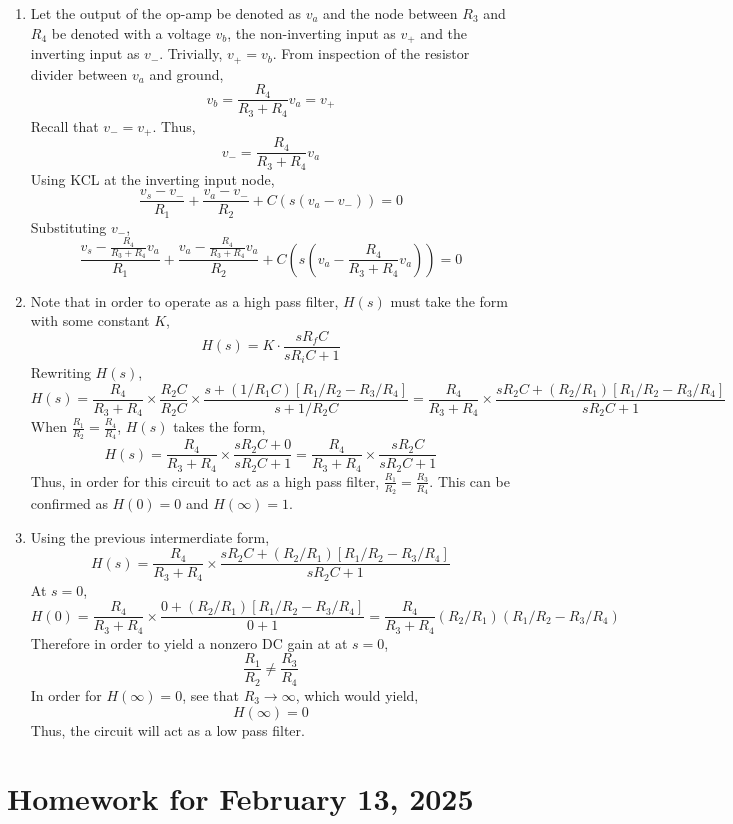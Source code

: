\documentclass{article}
\begin{document}
\begin{enumerate}[label=(\alph*)]
    \item Let the output of the op-amp be denoted as $v_a$ and the node between $R_3$ and $R_4$ be denoted with a voltage $v_b$, the non-inverting input as $v_+$ and the inverting input as $v_-$. 
        Trivially, $v_+=v_b$. From inspection of the resistor divider between $v_a$ and ground, 
        $$v_b=\frac{R_4}{R_3 + R_4}v_a=v_+$$
        Recall that $v_-=v_+$. Thus,
        $$v_-=\frac{R_4}{R_3 + R_4}v_a$$
        Using KCL at the inverting input node, 
        $$\frac{v_s - v_-}{R_1} + \frac{v_a - v_-}{R_2} + C(s(v_a - v_-)) = 0$$
        Substituting $v_-$,
        $$\frac{v_s - \frac{R_4}{R_3 + R_4}v_a}{R_1} + \frac{v_a - \frac{R_4}{R_3 + R_4}v_a}{R_2} + C(s(v_a - \frac{R_4}{R_3 + R_4}v_a)) = 0$$
    \item Note that in order to operate as a high pass filter, $H(s)$ must take the form with some constant $K$,
        $$H(s)=K\cdot \frac{sR_fC}{sR_iC + 1}$$
        Rewriting $H(s)$, $$H(s)=\frac{R_4}{R_3 + R_4} \times \frac{R_2C}{R_2C} \times \frac{s + (1/R_1C)[R_1/R_2 - R_3/R_4]}{s + 1/R_2C}=\frac{R_4}{R_3 + R_4} \times \frac{sR_2C + (R_2/R_1)[R_1/R_2 - R_3/R_4]}{sR_2C + 1}$$
        When $\frac{R_1}{R_2}=\frac{R_4}{R_4}$, $H(s)$ takes the form,
        $$H(s)=\frac{R_4}{R_3 + R_4} \times \frac{sR_2C + 0}{sR_2C + 1}=\frac{R_4}{R_3 + R_4} \times \frac{sR_2C}{sR_2C + 1}$$
        Thus, in order for this circuit to act as a high pass filter, $\frac{R_1}{R_2}=\frac{R_3}{R_4}$.
        This can be confirmed as $H(0)=0$ and $H(\infty)=1$.
    \item 
        Using the previous intermerdiate form, $$H(s)=\frac{R_4}{R_3 + R_4} \times \frac{sR_2C + (R_2/R_1)[R_1/R_2 - R_3/R_4]}{sR_2C + 1}$$
        At $s=0$, $$H(0)=\frac{R_4}{R_3 + R_4} \times \frac{0 + (R_2/R_1)[R_1/R_2 - R_3/R_4]}{0 + 1}=\frac{R_4}{R_3 + R_4} (R_2/R_1)(R_1/R_2 - R_3/R_4)$$
        Therefore in order to yield a nonzero DC gain at at $s=0$, $$\frac{R_1}{R_2} \neq \frac{R_3}{R_4}$$
        In order for $H(\infty)=0$, see that $R_3\rightarrow \infty$, which would yield,
        $$H(\infty)=0$$
        Thus, the circuit will act as a low pass filter.

\end{enumerate}


\section*{Homework for February 13, 2025}
\end{document}
